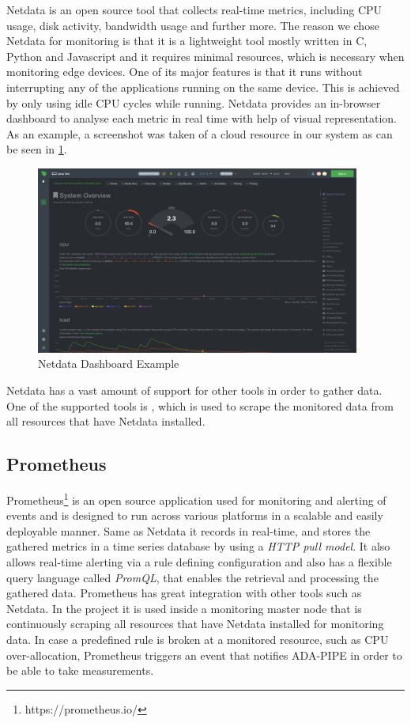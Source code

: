     Netdata is an open source tool that collects real-time metrics, including CPU usage, disk activity, bandwidth usage and further more.
    The reason we chose Netdata for monitoring is that it is a lightweight tool mostly written in C, Python and Javascript and it requires minimal resources, which is necessary when monitoring edge devices.
    One of its major features is that it runs without interrupting any of the applications running on the same device. This is achieved by only using idle CPU cycles while running.
    Netdata provides an in-browser dashboard to analyse each metric in real time with help of visual representation. As an example, a screenshot was taken of a cloud resource in our system as can be seen in \ref{fig:netdata-dashboard}.
    \begin{figure}[h!]
        \centering
        \includegraphics[width=0.95\textwidth]{figures/netdata.png}
        \caption{Netdata Dashboard Example}
        \label{fig:netdata-dashboard}
    \end{figure}
    Netdata has a vast amount of support for other tools in order to gather data. 
    One of the supported tools is , which is used to scrape the monitored data from all resources that have Netdata installed.

  \subsection{Prometheus}
  \label{sec:prometheus-evaluation-setup}
  
    Prometheus\footnote{https://prometheus.io/} is an open source application used for monitoring and alerting of events and is designed to run across various platforms in a scalable and easily deployable manner.
    Same as Netdata it records in real-time, and stores the gathered metrics in a time series database by using a \emph{HTTP pull model}. It also allows real-time alerting via a rule defining configuration and also has a flexible query language called \emph{PromQL}, that enables the retrieval and processing the gathered data. Prometheus has great integration with other tools such as Netdata.
    In the project it is used inside a monitoring master node that is continuously scraping all resources that have Netdata installed for monitoring data. In case a predefined rule is broken at a monitored resource, such as CPU over-allocation, Prometheus triggers an event that notifies ADA-PIPE in order to be able to take measurements.

